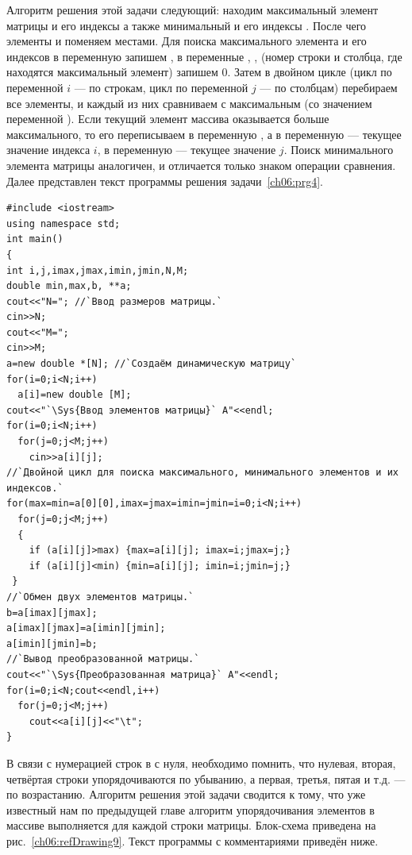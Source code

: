 
Алгоритм решения этой задачи следующий: находим максимальный элемент матрицы  и его индексы
 а также минимальный  и его индексы . После
чего элементы  и  поменяем местами. Для поиска максимального 
элемента и его индексов в
переменную  запишем , в переменные , , (номер
строки и столбца, где находятся максимальный элемент) запишем 0. Затем в двойном цикле 
(цикл по переменной $i$ ---
по строкам, цикл по переменной $j$ --- по столбцам) перебираем все элементы, и каждый из них сравниваем с
максимальным (со значением переменной ). Если текущий элемент массива оказывается больше
максимального, то его переписываем в переменную , а в переменную  --- текущее
значение индекса $i$, в переменную  --- текущее значение $j$. Поиск минимального элемента
матрицы аналогичен, и отличается только знаком операции сравнения. Далее представлен текст программы решения задачи~\ref{ch06:prg4}.
\begin{lstlisting}
#include <iostream>
using namespace std;
int main()
{
int i,j,imax,jmax,imin,jmin,N,M;
double min,max,b, **a; 
cout<<"N="; //`Ввод размеров матрицы.`
cin>>N;
cout<<"M=";
cin>>M;
a=new double *[N]; //`Создаём динамическую матрицу`
for(i=0;i<N;i++)
  a[i]=new double [M];
cout<<"`\Sys{Ввод элементов матрицы}` A"<<endl;
for(i=0;i<N;i++)
  for(j=0;j<M;j++)
    cin>>a[i][j];
//`Двойной цикл для поиска максимального, минимального элементов и их индексов.`
for(max=min=a[0][0],imax=jmax=imin=jmin=i=0;i<N;i++)
  for(j=0;j<M;j++)
  {
    if (a[i][j]>max) {max=a[i][j]; imax=i;jmax=j;}
    if (a[i][j]<min) {min=a[i][j]; imin=i;jmin=j;}
 }
//`Обмен двух элементов матрицы.`
b=a[imax][jmax];
a[imax][jmax]=a[imin][jmin];
a[imin][jmin]=b;
//`Вывод преобразованной матрицы.` 
cout<<"`\Sys{Преобразованная матрица}` A"<<endl;
for(i=0;i<N;cout<<endl,i++)
  for(j=0;j<M;j++)
    cout<<a[i][j]<<"\t";
}
\end{lstlisting}


В связи с нумерацией строк в  с нуля, необходимо помнить, что нулевая, 
вторая, четвёртая строки упорядочиваются по
убыванию, а первая, третья, пятая и т.д. --- по возрастанию. Алгоритм решения 
этой задачи сводится к тому, что уже
известный нам по предыдущей главе алгоритм упорядочивания элементов в массиве 
выполняется для каждой строки матрицы.
Блок-схема приведена на рис.~\ref{ch06:refDrawing9}. Текст программы с комментариями приведён ниже.

